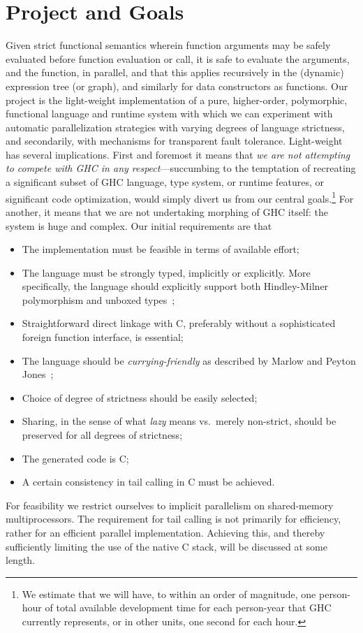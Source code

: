 \documentclass{llncs}
\begin{document}
\section{Project and Goals}
Given strict functional semantics wherein function arguments may be safely
evaluated before function evaluation or call, it is safe to evaluate the
arguments, and the function, in parallel, and that this applies recursively in
the (dynamic) expression tree (or graph), and similarly for data constructors
as functions.
%
Our project is the light-weight implementation of a pure, higher-order,
polymorphic, functional language and runtime system with which we can
experiment with automatic parallelization strategies with varying degrees of
language strictness, and secondarily, with mechanisms for transparent fault
tolerance.  Light-weight has several implications.  First and foremost it
means that \emph{we are not attempting to compete with GHC in any
  respect}---succumbing to the temptation of recreating a significant subset
of GHC language, type system, or runtime features, or significant code
optimization, would simply divert us from our central goals.\footnote{We
  estimate that we will have, to within an order of magnitude, one person-hour
  of total available development time for each person-year that GHC currently
  represents, or in other units, one second for each hour.}
For another, it means that we are not undertaking morphing of GHC
itself: the system is huge and complex.
%
Our initial requirements are that
\begin{itemize}
\item The implementation must be feasible in terms of available effort;
\item The language must be strongly typed, implicitly or explicitly.  More
  specifically, the language should explicitly support both Hindley-Milner
  polymorphism and unboxed types~\cite{Jones:1991};
\item Straightforward direct linkage with C, preferably without a sophisticated
  foreign function interface, is essential;
  \item The language should be \emph{currying-friendly} as described by Marlow
and Peyton Jones~\cite{Marlow:2004};
\item Choice of degree of strictness should be easily selected;
\item Sharing, in the sense of what \emph{lazy} means vs.\ merely non-strict,
  should be preserved for all degrees of strictness;
\item The generated code is C;
\item A certain consistency in tail calling in C must be achieved.
\end{itemize}
%
For feasibility we restrict ourselves to implicit parallelism on shared-memory
multiprocessors.  The requirement for tail calling is not primarily for
efficiency, rather for an efficient parallel implementation.  Achieving
this, and thereby sufficiently limiting the use of the native C stack, will be
discussed at some length.
\end{document}
